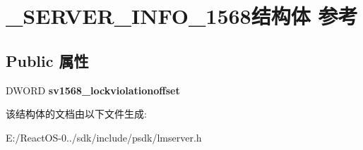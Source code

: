 \hypertarget{struct___s_e_r_v_e_r___i_n_f_o__1568}{}\section{\+\_\+\+S\+E\+R\+V\+E\+R\+\_\+\+I\+N\+F\+O\+\_\+1568结构体 参考}
\label{struct___s_e_r_v_e_r___i_n_f_o__1568}
\subsection*{Public 属性}
\begin{DoxyCompactItemize}
\item 
\mbox{\label{struct___s_e_r_v_e_r___i_n_f_o__1568_af8fa5957abde0609a28a4bda6571fa7a}} 
D\+W\+O\+RD {\bfseries sv1568\+\_\+lockviolationoffset}
\end{DoxyCompactItemize}


该结构体的文档由以下文件生成\+:\begin{DoxyCompactItemize}
\item 
E\+:/\+React\+O\+S-\/0../sdk/include/psdk/lmserver.\+h\end{DoxyCompactItemize}
